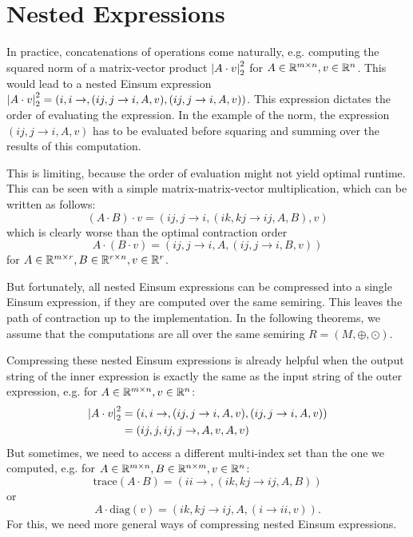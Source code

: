 \chapter{Nested Expressions}

In practice, concatenations of operations come naturally, e.g. computing the squared norm of a matrix-vector product $\left| A \cdot v \right|_2^2$
for $A \in \mathbb{R}^{m \times n}, v \in \mathbb{R}^n$.
This would lead to a nested Einsum expression $\left| A \cdot v \right|_2^2 = (i,i \rightarrow , (ij, j \rightarrow i, A, v), (ij, j \rightarrow i, A, v))$.
This expression dictates the order of evaluating the expression.
In the example of the norm, the expression $(ij, j \rightarrow i, A, v)$ has to be evaluated before squaring and summing over the results of this computation.

This is limiting, because the order of evaluation might not yield optimal runtime.
This can be seen with a simple matrix-matrix-vector multiplication, which can be written as follows:
$$(A \cdot B) \cdot v = (ij, j \rightarrow i, (ik, kj \rightarrow ij, A, B), v)$$
which is clearly worse than the optimal contraction order
$$A \cdot (B \cdot v) = (ij, j \rightarrow i, A, (ij, j \rightarrow i, B, v))$$
for $A \in \mathbb{R}^{m \times r}, B \in \mathbb{R}^{r \times n}, v \in \mathbb{R}^r$.

But fortunately, all nested Einsum expressions can be compressed into a single Einsum expression, if they are computed over the same semiring.
This leaves the path of contraction up to the implementation.
In the following theorems, we assume that the computations are all over the same semiring $R = (M, \oplus, \odot)$.



Compressing these nested Einsum expressions is already helpful when the output string of the inner expression is exactly the same as the input string of the outer expression,
e.g. for $A \in \mathbb{R}^{m \times n}, v \in \mathbb{R}^{n}$:
\begin{align*}
    \left| A \cdot v \right|_2^2 & = (i,i\rightarrow,(ij, j \rightarrow i, A, v),(ij, j \rightarrow i, A, v)) \\
                        & = (ij,j,ij,j\rightarrow,A,v,A,v)
\end{align*}
But sometimes, we need to access a different multi-index set than the one we computed, e.g. for $A \in \mathbb{R}^{m \times n}, B \in \mathbb{R}^{n \times m}, v \in \mathbb{R}^{n}$:
$$\text{trace}(A \cdot B) = (ii \rightarrow, (ik, kj \rightarrow ij, A, B))$$
or
$$A \cdot \text{diag}(v) = (ik, kj \rightarrow ij, A, (i \rightarrow ii, v)).$$
For this, we need more general ways of compressing nested Einsum expressions.


